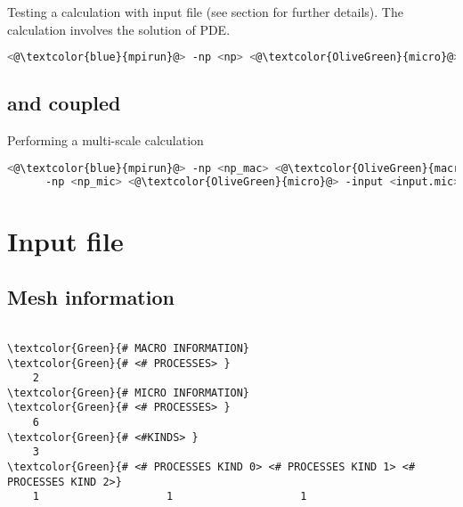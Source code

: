 Testing a \micro calculation with input file (see section for further details).
The calculation involves the solution of PDE.
\begin{lstlisting}[frame=single,language=bash]
<@\textcolor{blue}{mpirun}@> -np <np> <@\textcolor{OliveGreen}{micro}@> -input <input.mic>
\end{lstlisting}

\subsection{\macro and \micro coupled}

Performing a multi-scale calculation
\begin{lstlisting}[frame=single,language=bash]
<@\textcolor{blue}{mpirun}@> -np <np_mac> <@\textcolor{OliveGreen}{macro}@> -input <input.mac> :
      -np <np_mic> <@\textcolor{OliveGreen}{micro}@> -input <input.mic>
\end{lstlisting}


\section{Input file}

\subsection{Mesh information}

\begin{Verbatim}[frame=single,commandchars=\\\{\}]

\textcolor{Green}{# MACRO INFORMATION}
\textcolor{Green}{# <# PROCESSES> }
    2  
\textcolor{Green}{# MICRO INFORMATION}
\textcolor{Green}{# <# PROCESSES> }
    6  
\textcolor{Green}{# <#KINDS> }
    3
\textcolor{Green}{# <# PROCESSES KIND 0> <# PROCESSES KIND 1> <# PROCESSES KIND 2>}
    1                    1                    1
\end{Verbatim}





